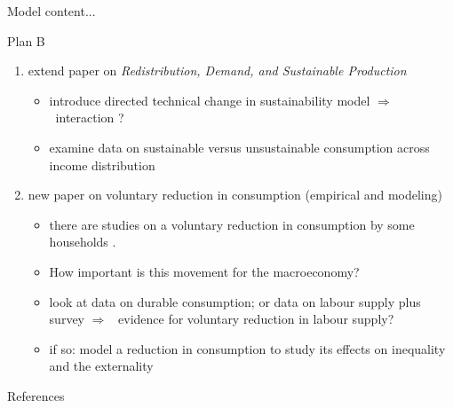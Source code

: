 \documentclass[11pt,aspectratio=169]{beamer}
\newcommand{\ar}{$\Rightarrow$ \ }
\begin{document}
\begin{frame}{Model}
	content...
\end{frame}

\begin{frame}{Plan B}
\begin{enumerate}
	\item extend paper on \textit{Redistribution, Demand, and Sustainable Production}
	\begin{itemize}
\item introduce directed technical change in sustainability model \ar interaction ?
\item examine data on sustainable versus unsustainable consumption across income distribution 
	\end{itemize}
\item new paper on voluntary reduction in consumption (empirical and modeling)
\begin{itemize}
	\item there are studies on a voluntary reduction in consumption by some households \citep{Alexander2012TheContext}. 
	\item How important is this movement for the macroeconomy?
\item look at data on durable consumption; or data on labour supply plus survey \ar evidence for voluntary reduction in labour supply?
\item if so: model a reduction in consumption to study its effects on inequality and the externality
\end{itemize}
\end{enumerate}
\end{frame}
\begin{frame}[allowframebreaks]{References}
	
	
	
\end{frame}
\end{document}
